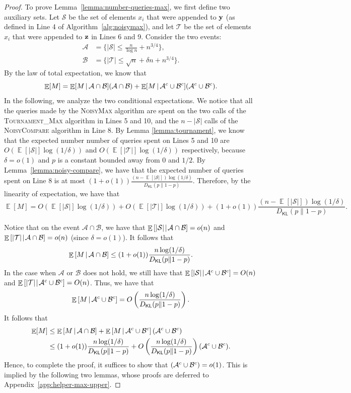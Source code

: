 \documentclass[journal, onecolumn]{IEEEtran}
\theoremstyle{plain}
\theoremstyle{definition}
\theoremstyle{remark}
\def\cs{{\mathcal S}}
\def\ct{{\mathcal T}}
\def\ca{{\mathcal A}}
\def\cb{{\mathcal B}}
\DeclareMathOperator\E{\mathbb{E}}
\let\P\relax
\DeclareMathOperator\P{\mathsf{P}}
\def\DKL{{D_\mathsf{KL}(p\|1-p)}}
\newcommand{\cond}{\mathchoice{\,\vert\,}{\mspace{2mu}\vert\mspace{2mu}}{\vert}{\vert}}
\newcommand{\stourmax}{\textsc{Tournament\_Max }}
\begin{document}
\begin{proof}
    To prove Lemma~\ref{lemma:number-queries-max}, we first define two auxiliary sets. Let $\cs$ be the set of elements $x_i$ that were appended to ${\bf y}$ (as defined in Line 4 of Algorithm~\ref{alg:noisymax}), and let $\ct$ be the set of elements $x_i$ that were appended to ${\bf z}$ in Lines 6 and 9. Consider the two events:
    \begin{align*}
        \ca &= \{|\cs|\le \frac{n}{\log n}+n^{3/4}\},\\
        \cb &= \{|\ct|\le \sqrt{n}+\delta n+n^{3/4}\}.
    \end{align*}
    By the law of total expectation, we know that
    \[
        \E[M]=\E[M \cond \ca\cap\cb]\P(\ca\cap\cb)+\E[M \cond \ca^c\cup\cb^c]\P(\ca^c\cup\cb^c).
    \]
    In the following, we analyze the two conditional expectations. We notice that all the queries made by the \textsc{NoisyMax} algorithm are spent on the two calls of the \stourmax algorithm in Lines 5 and 10, and the $n-|\cs|$ calls of the \textsc{NoisyCompare} algorithm in Line 8. 
    By Lemma \ref{lemma:tournament}, we know that the expected number number of queries spent on Lines 5 and 10 are $O\left(\E\left[|\cs|\right]\log(1/\delta)\right)$ and $O\left(\E\left[|\ct|\right]\log(1/\delta)\right)$ respectively, because $\delta=o(1)$ and $p$ is a constant bounded away from $0$ and $1/2$. By Lemma~\ref{lemma:noisy-compare}, we have that the expected number of queries spent on Line 8 is at most $(1+o(1))\frac{(n-\E\left[|\cs|\right])\log(1/\delta)}{\DKL}$. Therefore, by the linearity of expectation, we have that 
    \[
        \E[M] = O\left(\E\left[|\cs|\right]\log(1/\delta)\right) + O\left(\E\left[|\ct|\right]\log(1/\delta)\right) + (1+o(1))\frac{(n-\E\left[|\cs|\right])\log(1/\delta)}{\DKL}.
    \]
    
    Notice that on the event $\ca \cap \cb$, we have that $\E\left[|\cs| \cond \ca \cap \cb \right]=o(n)$ and $\E\left[|\ct|\cond \ca \cap \cb\right]=o(n)$ (since $\delta=o(1)$). It follows that
    \[
        \E\left[M \cond \ca\cap\cb\right ]\le (1+o(1))\frac{n\log(1/\delta)}{\DKL}.
    \]
    In the case when $\ca$ or $\cb$ does not hold, we still have that $\E\left[|\cs|\cond \ca^c \cup \cb^c \right]=O(n)$ and $\E\left[|\ct|\cond \ca^c \cup \cb^c\right]=O(n)$. Thus, we have that
    \[
        \E\left[M \cond \ca^c\cup\cb^c\right]=O\left(\frac{n\log(1/\delta)}{\DKL}\right).
    \]
    It follows that 
    \begin{align*}
        \E[M]&\le \E\left[M \cond\ca\cap\cb\right]+\E\left[M \cond \ca^c\cup\cb^c\right] \P(\ca^c\cup\cb^c)\\
        &\le (1+o(1))\frac{n\log(1/\delta)}{\DKL}+O\left(\frac{n\log(1/\delta)}{\DKL}\right)\P(\ca^c\cup\cb^c).
    \end{align*}
    Hence, to complete the proof, it suffices to show that $\P(\ca^c\cup\cb^c)=o(1)$. This is implied by the following two lemmas, whose proofs are deferred to Appendix~\ref{app:helper-max-upper}.
    

\end{proof}
\end{document}
